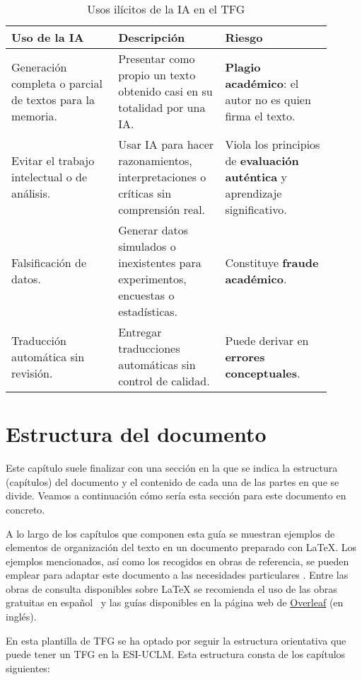 \begin{table}[H]%
	\centering
	\caption{Usos ilícitos de la IA en el TFG}
	\label{tab:ia}
	\begin{tabular}{ | p{0.3\linewidth} | p{0.3\linewidth} | p{0.3\linewidth} |}
		\hline
		\textbf{Uso de la IA} & \textbf{Descripción} & \textbf{Riesgo} \\
		\hline
		Generación completa o parcial de textos para la memoria.&
		Presentar como propio un texto obtenido casi en su totalidad por una IA. &
		\textbf{Plagio académico}: el autor no es quien firma el texto.\\
		\hline
		Evitar el trabajo intelectual o de análisis. &
		Usar IA para hacer razonamientos, interpretaciones o críticas sin comprensión real. &
		Viola los principios de \textbf{evaluación auténtica} y aprendizaje significativo. \\
		\hline
		Falsificación de datos. & Generar datos simulados o inexistentes para experimentos, encuestas o estadísticas. &
		Constituye \textbf{fraude académico}.\\
		\hline
		Traducción automática sin revisión. &
		Entregar traducciones automáticas sin control de calidad. &
		Puede derivar en \textbf{errores conceptuales}.\\
		\hline
	\end{tabular}
\end{table}


\section{Estructura del documento}
Este capítulo suele finalizar con una sección en la que se indica la estructura (capítulos) del documento y el contenido de cada una de las partes en que se divide. Veamos a continuación cómo sería esta sección para este documento en concreto.

A lo largo de los capítulos que componen esta guía se muestran ejemplos de elementos de organización del texto en un documento preparado con \LaTeX{}. Los ejemplos mencionados, así como los recogidos en obras de referencia, se pueden emplear para adaptar este documento a las necesidades particulares  \cite{lamport94,wikibookLaTex10}. Entre las obras de consulta disponibles sobre \LaTeX{} se recomienda el uso de las obras gratuitas en español~\cite{oetiker14,borbon21} y las guías disponibles en la página web de \href{https://es.overleaf.com/learn}{Overleaf} (en inglés).

En esta plantilla de TFG se ha optado por seguir la estructura orientativa que puede tener un TFG en la \mbox{ESI-UCLM}. Esta estructura consta de los capítulos siguientes:


